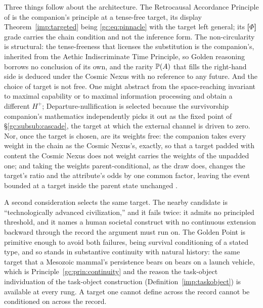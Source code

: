 Three things follow about the architecture. The Retrocausal Accordance
Principle of \cite{GoldenTargeted} is the companion's principle
at a tense-free target, its display Theorem~\ref{imp:targeted} being
\eqref{gc:eq:pinnacle} with the target left general; its
\textbf{[$\Phi$]} grade carries the chain condition and not the
inference form. The non-circularity is structural: the tense-freeness
that licenses the substitution is the companion's, inherited from the
Aethic Indiscriminate Time Principle, so Golden reasoning borrows no
conclusion of its own, and the rarity $\mathbb{P}(A)$ that fills the
right-hand side is deduced under the Cosmic Nexus with no reference to
any future. And the choice of target is not free. One might abstract
from the space-reaching invariant to maximal capability or to maximal
information processing and obtain a different $H^{+}$;
Departure-nullification is selected because the survivorship
companion's mathematics \cite{GoldenSurvivorship} independently picks it out as the fixed point
of \S\ref{gc:subsub:cascade}, the target at which the external channel
is driven to zero. Nor, once the target is chosen, are its weights free: the companion
takes every weight in the chain as the Cosmic Nexus's, exactly, so that
a target padded with content the Cosmic Nexus does not weight carries
the weights of the unpadded one; and taking the weights
parent-conditional, as the draw does, changes the target's ratio and
the attribute's odds by one common factor, leaving the event bounded
at a target inside the parent state unchanged \cite{Nexus}.

A second consideration selects the same target. The nearby candidate
is ``technologically advanced civilization,'' and it fails twice: it
admits no principled threshold, and it names a human societal
construct with no continuous extension backward through the record
the argument must run on. The Golden Point is primitive enough to
avoid both failures, being survival conditioning of a stated type, and
so stands in substantive continuity with natural history: the same
target that a Mesozoic mammal's persistence bears on bears on a launch
vehicle, which is Principle~\ref{gc:prin:continuity} and the reason
the task-object individuation of the task-object construction (Definition~\ref{imp:taskobject}) is available at every
rung. A target one cannot define across the record cannot be
conditioned on across the record.

